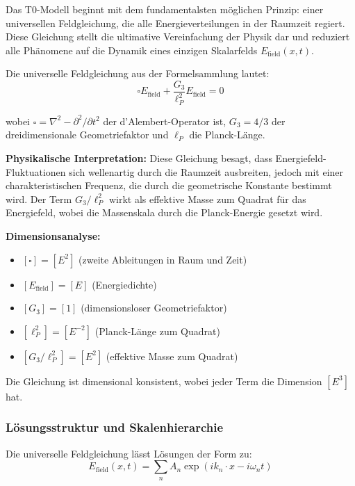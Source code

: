 \documentclass[12pt,a4paper]{article}
\begin{document}
	Das T0-Modell beginnt mit dem fundamentalsten möglichen Prinzip: einer universellen Feldgleichung, die alle Energieverteilungen in der Raumzeit regiert. Diese Gleichung stellt die ultimative Vereinfachung der Physik dar und reduziert alle Phänomene auf die Dynamik eines einzigen Skalarfelds $E_{\text{field}}(x,t)$.
	
	Die universelle Feldgleichung aus der Formelsammlung lautet:
	\begin{equation}
		\boxed{\square E_{\text{field}} + \frac{G_3}{\ell_P^2} E_{\text{field}} = 0}
	\end{equation}
	
	wobei $\square = \nabla^2 - \partial^2/\partial t^2$ der d'Alembert-Operator ist, $G_3 = 4/3$ der dreidimensionale Geometriefaktor und $\ell_P$ die Planck-Länge.
	
	\textbf{Physikalische Interpretation:} Diese Gleichung besagt, dass Energiefeld-Fluktuationen sich wellenartig durch die Raumzeit ausbreiten, jedoch mit einer charakteristischen Frequenz, die durch die geometrische Konstante bestimmt wird. Der Term $G_3/\ell_P^2$ wirkt als effektive Masse zum Quadrat für das Energiefeld, wobei die Massenskala durch die Planck-Energie gesetzt wird.
	
	\textbf{Dimensionsanalyse:}
	\begin{itemize}
		\item $[\square] = [E^2]$ (zweite Ableitungen in Raum und Zeit)
		\item $[E_{\text{field}}] = [E]$ (Energiedichte)
		\item $[G_3] = [1]$ (dimensionsloser Geometriefaktor)
		\item $[\ell_P^2] = [E^{-2}]$ (Planck-Länge zum Quadrat)
		\item $[G_3/\ell_P^2] = [E^2]$ (effektive Masse zum Quadrat)
	\end{itemize}
	
	Die Gleichung ist dimensional konsistent, wobei jeder Term die Dimension $[E^3]$ hat.
	
	\subsubsection{Lösungsstruktur und Skalenhierarchie}
	
	Die universelle Feldgleichung lässt Lösungen der Form zu:
	\begin{equation}
		E_{\text{field}}(x,t) = \sum_n A_n \exp(ik_n \cdot x - i\omega_n t)
	\end{equation}
	
\end{document}
